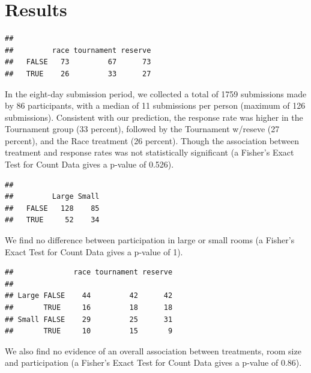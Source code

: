 \documentclass[12pt,]{article}
\theoremstyle{plain} %
\begin{document}
\section{Results}\label{results}

\begin{verbatim}
##        
##         race tournament reserve
##   FALSE   73         67      73
##   TRUE    26         33      27
\end{verbatim}

In the eight-day submission period, we collected a total of 1759
submissions made by 86 participants, with a median of 11 submissions per
person (maximum of 126 submissions). Consistent with our prediction, the
response rate was higher in the Tournament group (33 percent), followed
by the Tournament w/reseve (27 percent), and the Race treatment (26
percent). Though the association between treatment and response rates
was not statistically significant (a Fisher's Exact Test for Count Data
gives a p-value of 0.526).

\begin{verbatim}
##        
##         Large Small
##   FALSE   128    85
##   TRUE     52    34
\end{verbatim}

We find no difference between participation in large or small rooms (a
Fisher's Exact Test for Count Data gives a p-value of 1).

\begin{verbatim}
##              race tournament reserve
##                                     
## Large FALSE    44         42      42
##       TRUE     16         18      18
## Small FALSE    29         25      31
##       TRUE     10         15       9
\end{verbatim}

We also find no evidence of an overall association between treatments,
room size and participation (a Fisher's Exact Test for Count Data gives
a p-value of 0.86).
\end{document}

